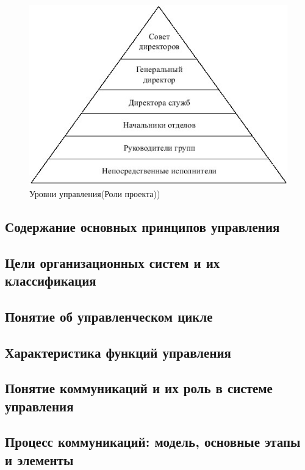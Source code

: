 \documentclass[a4paper,12pt,oneside,final]{extarticle}
\makeatletter
\numberwithin{equation}{section}
\def\maxwidth#1{\ifdim\Gin@nat@width>#1 #1\else\Gin@nat@width\fi}
\makeatother
\begin{document}
\begin{figure}[h]
	\centering
	\includegraphics[width=\maxwidth{\textwidth}]{management-figures/roles_in_organized_systems}
	\caption{Уровни управления(Роли проекта))}
\end{figure}

\subsection{Содержание основных принципов управления}

\subsection{Цели организационных систем и их классификация}

\subsection{Понятие об управленческом цикле}

\subsection{Характеристика функций управления}

\subsection{Понятие коммуникаций и их роль в системе управления}

\subsection{Процесс коммуникаций: модель, основные этапы и элементы}
\end{document}
